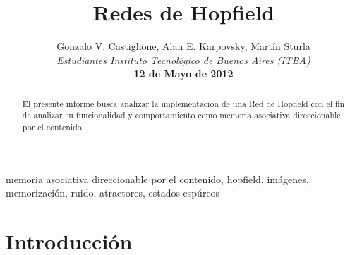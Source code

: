 \documentclass[%
    final,
    reprint,
    notitlepage,
    narroweqnarray,
    inline,
    twoside,
    invited
    ]{ieee}
\begin{document}
\title[Redes de Hopfield]{%
       Redes de Hopfield}

\author[Castiglione, Karpovsky, Sturla]{Gonzalo V. Castiglione, Alan E. Karpovsky, Martín Sturla\\\textit{Estudiantes 
       Instituto Tecnológico de Buenos Aires (ITBA)}\\
\textbf{12 de Mayo de 2012}
}


\lognumber{}
\pubitemident{}


\maketitle               

\begin{abstract} 
El presente informe busca analizar la implementación de una Red de Hopfield con el fin de analizar su funcionalidad y comportamiento como memoria asociativa direccionable por el contenido.
\end{abstract}

\begin{keywords}
memoria asociativa direccionable por el contenido, hopfield, imágenes, memorización, ruido, atractores, estados espúreos
\end{keywords}

\section{Introducción}
\end{document}
